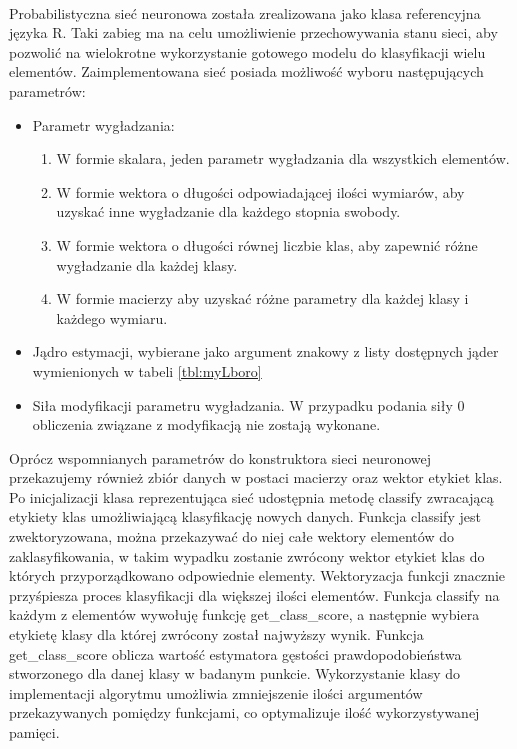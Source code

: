 \documentclass[a4paper,12pt,twoside]{article}
\begin{document}
\paragraph{}
Probabilistyczna sieć neuronowa została zrealizowana jako klasa referencyjna języka R. Taki zabieg ma na celu umożliwienie przechowywania stanu sieci, aby pozwolić na wielokrotne wykorzystanie gotowego modelu do klasyfikacji wielu elementów. Zaimplementowana sieć posiada możliwość wyboru następujących parametrów: 
\begin{itemize}
\item Parametr wygładzania:
\begin{enumerate}
\item W formie skalara, jeden parametr wygładzania dla wszystkich elementów.
\item W formie wektora o długości odpowiadającej ilości wymiarów, aby uzyskać inne wygładzanie dla każdego stopnia swobody.
\item W formie wektora o długości równej liczbie klas, aby zapewnić różne wygładzanie dla każdej klasy.
\item W formie macierzy aby uzyskać różne parametry dla każdej klasy i każdego wymiaru. 
\end{enumerate}
\item Jądro estymacji, wybierane jako argument znakowy z listy dostępnych jąder wymienionych w tabeli \ref{tbl:myLboro}
\item Siła modyfikacji parametru wygładzania. W przypadku podania siły 0 obliczenia związane z modyfikacją nie zostają wykonane. 
\end{itemize}
Oprócz wspomnianych parametrów do konstruktora sieci neuronowej przekazujemy również zbiór danych w postaci macierzy oraz wektor etykiet klas. Po inicjalizacji klasa reprezentująca sieć udostępnia metodę classify zwracającą etykiety klas umożliwiającą klasyfikację nowych danych. Funkcja classify jest zwektoryzowana, można przekazywać do niej całe wektory elementów do zaklasyfikowania, w takim wypadku zostanie zwrócony wektor etykiet klas do których przyporządkowano odpowiednie elementy. Wektoryzacja funkcji znacznie przyśpiesza proces klasyfikacji dla większej ilości elementów. Funkcja classify na każdym z elementów wywołuję funkcję get\_class\_score, a następnie wybiera etykietę klasy dla której zwrócony został najwyższy wynik. Funkcja get\_class\_score oblicza wartość estymatora gęstości prawdopodobieństwa stworzonego dla danej klasy w badanym punkcie. Wykorzystanie klasy do implementacji algorytmu umożliwia zmniejszenie ilości argumentów przekazywanych pomiędzy funkcjami, co optymalizuje ilość wykorzystywanej pamięci. 
\end{document}
